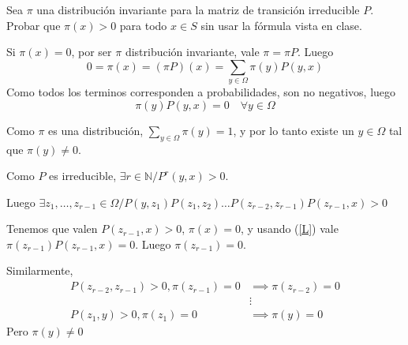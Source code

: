 \begin{ejercicio}{8}{
	Sea $\pi$ una distribución invariante para la matriz de transición irreducible $P$. Probar que $\pi(x) > 0$ para todo $x \in S$ sin usar la fórmula vista en clase.
}{
	Si $\pi (x) = 0$, por ser $\pi$ distribuci\'on invariante, vale $\pi = \pi P$. Luego
	\[
		0 =
		\pi(x)
		= (\pi P)(x)
		= \sum_{y \in \Omega} \pi(y) P(y,x)
	\]
	Como todos los terminos corresponden a probabilidades, son no negativos, luego
	\begin{equation}
		\label{L}
		\pi(y) P(y,x) = 0 \quad \forall y \in \Omega
	\end{equation}

	Como $\pi$ es una distribuci\'on, $\sum_{y \in \Omega} \pi(y) = 1$, y por lo tanto existe un
	$y \in \Omega$ tal que $\pi(y) \neq 0$.


	Como $P$ es irreducible, $\exists r \in \mathbb N / P^r(y,x) > 0$.


	Luego
	\begin{math}
		\exists z_1, \dots, z_{r-1} \in \Omega
	/
		P(y,z_1) P(z_1, z_2) \dots P(z_{r-2}, z_{r-1}) P(z_{r-1}, x) >0
	\end{math}


	Tenemos que valen $P(z_{r-1}, x) > 0$, $\pi(x) = 0$,
	y usando (\ref{L}) vale
	$\pi(z_{r-1}) P(z_{r-1}, x) = 0$.
	Luego $\pi(z_{r-1}) = 0$.


	Similarmente,
	\begin{align*}
		P(z_{r-2}, z_{r-1}) > 0, \pi(z_{r-1}) = 0 &\implies \pi(z_{r-2}) = 0 \\
		&\vdots \\
		P(z_1, y) > 0, \pi(z_1) = 0 &\implies \pi(y) = 0
	\end{align*}
	Pero $\pi(y) \neq 0$
}
	
\end{ejercicio}